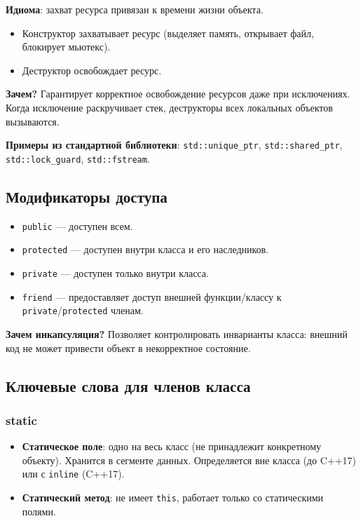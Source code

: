 \documentclass[12pt,a4paper]{article}
\begin{document}
\textbf{Идиома}: захват ресурса привязан к времени жизни объекта.
\begin{itemize}
    \item Конструктор захватывает ресурс (выделяет память, открывает файл, блокирует мьютекс).
    \item Деструктор освобождает ресурс.
\end{itemize}

\textbf{Зачем?} Гарантирует корректное освобождение ресурсов даже при исключениях. Когда исключение раскручивает стек, деструкторы всех локальных объектов вызываются.

\textbf{Примеры из стандартной библиотеки}: \texttt{std::unique\_ptr}, \texttt{std::shared\_ptr}, \texttt{std::lock\_guard}, \texttt{std::fstream}.

\subsection{Модификаторы доступа}

\begin{itemize}
    \item \texttt{public} --- доступен всем.
    \item \texttt{protected} --- доступен внутри класса и его наследников.
    \item \texttt{private} --- доступен только внутри класса.
    \item \texttt{friend} --- предоставляет доступ внешней функции/классу к \texttt{private}/\texttt{protected} членам.
\end{itemize}

\textbf{Зачем инкапсуляция?} Позволяет контролировать инварианты класса: внешний код не может привести объект в некорректное состояние.

\subsection{Ключевые слова для членов класса}

\subsubsection{static}
\begin{itemize}
    \item \textbf{Статическое поле}: одно на весь класс (не принадлежит конкретному объекту). Хранится в сегменте данных. Определяется вне класса (до C++17) или с \texttt{inline} (C++17).
    \item \textbf{Статический метод}: не имеет \texttt{this}, работает только со статическими полями.
\end{itemize}
\end{document}
